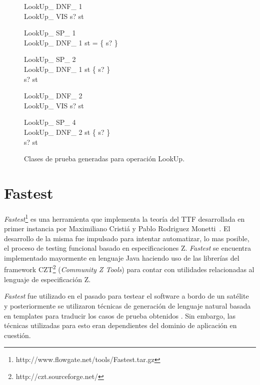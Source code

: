 \begin{figure}[H]
  \centering
  \begin{schema}{LookUp\_ DNF\_ 1}\\
  LookUp\_ VIS 
  \where
  s? \in \dom st
  \end{schema}


  \begin{schema}{LookUp\_ SP\_ 1}\\
  LookUp\_ DNF\_ 1 
  \where
  \dom st = \{ s? \}
  \end{schema}


  \begin{schema}{LookUp\_ SP\_ 2}\\
  LookUp\_ DNF\_ 1 
  \where
  \dom st \neq \{ s? \} \\
  s? \in \dom st
  \end{schema}


  \begin{schema}{LookUp\_ DNF\_ 2}\\
  LookUp\_ VIS 
  \where
  s? \notin \dom st
  \end{schema}


  \begin{schema}{LookUp\_ SP\_ 4}\\
  LookUp\_ DNF\_ 2 
  \where
  \dom st \neq \{ s? \} \\
  s? \in \dom st
  \end{schema}
  \label{fig:ej_tcl_lookup}
  \caption{Clases de prueba generadas para operación LookUp.}
\end{figure}

\section{Fastest}

\emph{Fastest}\footnote{http://www.flowgate.net/tools/Fastest.tar.gz} es una herramienta que implementa la teoría del TTF desarrollada en primer instancia por Maximiliano Cristiá y Pablo Rodriguez Monetti~\cite{fastest1}. El desarrollo de la misma fue impulsado para intentar automatizar, lo mas posible, el proceso de testing funcional basado en especificaciones Z. \emph{Fastest} se encuentra implementado mayormente en lenguaje Java haciendo uso de las librerías del framework CZT\footnote{http://czt.sourceforge.net/} (\emph{Community Z Tools}) para contar con utilidades relacionadas al lenguaje de especificación Z. 

\emph{Fastest} fue utilizado en el pasado para testear el software a bordo de un satélite~\cite{satelite} y posteriormente se utilizaron técnicas de generación de lenguaje natural basada en templates para traducir los casos de prueba obtenidos \cite{cristia_pluss}. Sin embargo, las técnicas utilizadas para esto eran dependientes del dominio de aplicación en cuestión.

